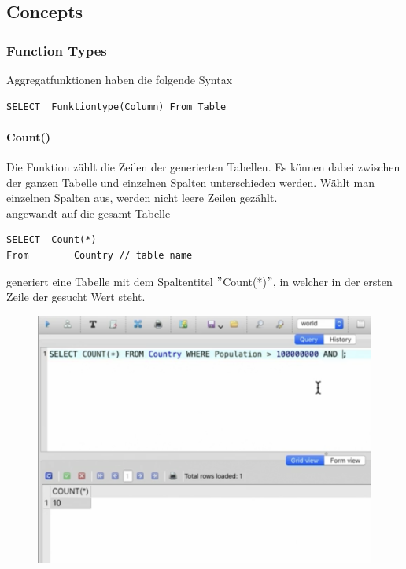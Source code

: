 \subsection{Concepts}
\subsubsection{Function Types}
Aggregatfunktionen haben die folgende Syntax

\begin{lstlisting}[style=SQL]
SELECT 	Funktiontype(Column) From Table
\end{lstlisting}

\paragraph{Count()}
Die Funktion  zählt die Zeilen der generierten Tabellen.
Es können dabei zwischen der ganzen Tabelle und einzelnen Spalten unterschieden werden. 
Wählt man einzelnen Spalten aus, werden nicht leere Zeilen gezählt.\\

 angewandt auf die gesamt Tabelle
\begin{lstlisting}[style=SQL]
SELECT 	Count(*)
From 		Country // table name
\end{lstlisting}

generiert eine Tabelle mit dem Spaltentitel $"$Count(*)$"$, in welcher in der ersten Zeile der gesucht Wert steht.
\begin{figure}[H]
	\centering
	\includegraphics[scale = 0.3]{attachment/chapter_3/Scc046}
	\caption{}
	\label{fig:Scc046}
\end{figure}

